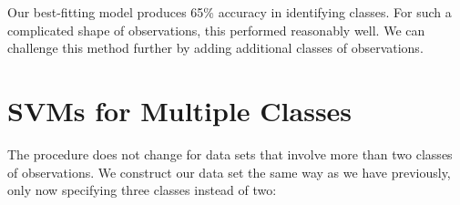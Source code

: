 \documentclass[]{book}
\newenvironment{Shaded}{\begin{snugshade}}{\end{snugshade}}
\newcommand{\CommentTok}[1]{\textcolor[rgb]{0.56,0.35,0.01}{\textit{#1}}}
\newcommand{\DataTypeTok}[1]{\textcolor[rgb]{0.13,0.29,0.53}{#1}}
\newcommand{\KeywordTok}[1]{\textcolor[rgb]{0.13,0.29,0.53}{\textbf{#1}}}
\newcommand{\NormalTok}[1]{#1}
\newcommand{\OperatorTok}[1]{\textcolor[rgb]{0.81,0.36,0.00}{\textbf{#1}}}
\newcommand{\StringTok}[1]{\textcolor[rgb]{0.31,0.60,0.02}{#1}}
\begin{document}
\begin{Shaded}
\end{Shaded}

Our best-fitting model produces 65\% accuracy in identifying classes. For such a complicated shape of observations, this performed reasonably well. We can challenge this method further by adding additional classes of observations.

\hypertarget{svms-for-multiple-classes}{%
\section{SVMs for Multiple Classes}\label{svms-for-multiple-classes}}

The procedure does not change for data sets that involve more than two classes of observations. We construct our data set the same way as we have previously, only now specifying three classes instead of two:
\end{document}
